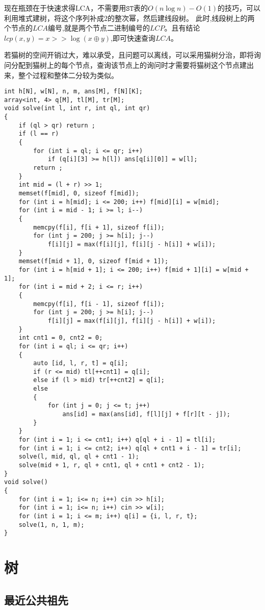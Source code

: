 \documentclass[a4paper, fontset=none]{ctexart}
\begin{document}
现在瓶颈在于快速求得$\text{LCA}$，不需要用$\texttt{ST}$表的$O(n\log n)-O(1)$的技巧，可以利用堆式建树，将这个序列补成$2$的整次幂，然后建线段树。
此时,线段树上的两个节点的$LCA$编号,就是两个节点二进制编号的$LCP$。且有结论$lcp(x, y)=x >> \log(x\oplus y)$,即可快速查询$LCA$。

若猫树的空间开销过大，难以承受，且问题可以离线，可以采用猫树分治，即将询问分配到猫树上的每个节点，查询该节点上的询问时才需要将猫树这个节点建出来，整个过程和整体二分较为类似。
\begin{verbatim}
int h[N], w[N], n, m, ans[M], f[N][K];
array<int, 4> q[M], tl[M], tr[M];
void solve(int l, int r, int ql, int qr)
{
    if (ql > qr) return ;
    if (l == r)
    {
        for (int i = ql; i <= qr; i++)
            if (q[i][3] >= h[l]) ans[q[i][0]] = w[l];
        return ;
    }
    int mid = (l + r) >> 1;
    memset(f[mid], 0, sizeof f[mid]);
    for (int i = h[mid]; i <= 200; i++) f[mid][i] = w[mid];
    for (int i = mid - 1; i >= l; i--)
    {
        memcpy(f[i], f[i + 1], sizeof f[i]);
        for (int j = 200; j >= h[i]; j--)
            f[i][j] = max(f[i][j], f[i][j - h[i]] + w[i]);
    }
    memset(f[mid + 1], 0, sizeof f[mid + 1]);
    for (int i = h[mid + 1]; i <= 200; i++) f[mid + 1][i] = w[mid + 1];
    for (int i = mid + 2; i <= r; i++)
    {
        memcpy(f[i], f[i - 1], sizeof f[i]);
        for (int j = 200; j >= h[i]; j--)
            f[i][j] = max(f[i][j], f[i][j - h[i]] + w[i]);
    }
    int cnt1 = 0, cnt2 = 0;
    for (int i = ql; i <= qr; i++)
    {
        auto [id, l, r, t] = q[i];
        if (r <= mid) tl[++cnt1] = q[i];
        else if (l > mid) tr[++cnt2] = q[i];
        else
        {
            for (int j = 0; j <= t; j++)
                ans[id] = max(ans[id], f[l][j] + f[r][t - j]);
        }
    }
    for (int i = 1; i <= cnt1; i++) q[ql + i - 1] = tl[i];
    for (int i = 1; i <= cnt2; i++) q[ql + cnt1 + i - 1] = tr[i];
    solve(l, mid, ql, ql + cnt1 - 1);
    solve(mid + 1, r, ql + cnt1, ql + cnt1 + cnt2 - 1);
}
void solve()
{
    for (int i = 1; i<= n; i++) cin >> h[i];
    for (int i = 1; i<= n; i++) cin >> w[i];
    for (int i = 1; i <= m; i++) q[i] = {i, l, r, t};
    solve(1, n, 1, m);
}
\end{verbatim}

\section{树}
\subsection{最近公共祖先}
\end{document}
